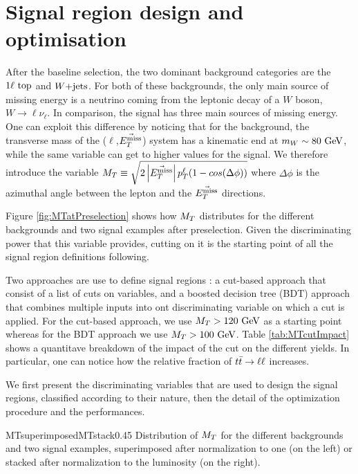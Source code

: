     \section{Signal region design and optimisation \label{sec:analysis_optimization}}

    After the baseline selection, the two dominant background categories are the $1\ell~\text{top}$
    and $\text{$W$+jets}$. For both of these backgrounds, the only main source of missing energy is a neutrino
    coming from the leptonic decay of a $W$ boson, $W \rightarrow \ell \nu_{\ell}$. In comparison,
    the signal has three main sources of missing energy. One can exploit this difference by noticing
    that for the background, the transverse mass of the ($\ell$,$\vec{E_T^\text{miss}}$) system has a kinematic
    end at $m_{W} \sim 80 ~\text{GeV}$, while the same variable can get to higher values for the signal.
    We therefore introduce the variable $M_T \equiv \sqrt{2 \left|\vec{E_T^\text{miss}}\right| p_T^\ell ( 1 - cos( \Delta \phi  ) ) }$
    where $\Delta \phi$ is the azimuthal angle between the lepton and the $\vec{E_T^\text{miss}}$ directions.

    Figure \ref{fig:MTatPreselection} shows how $M_T$ distributes for the different backgrounds and
    two signal examples after preselection. Given the discriminating power that this variable provides,
    cutting on it is the starting point of all the signal region definitions following. 
    
    Two approaches are use to define signal regions : a cut-based approach that consist of a list
    of cuts on variables, and a boosted decision tree (BDT) approach that combines multiple inputs into
    ont discriminating variable on which a cut is applied. For the cut-based approach, we use $M_T > 120 ~\text{GeV}$
    as a starting point whereas for the BDT approach we use $M_T > 100 ~\text{GeV}$. Table \ref{tab:MTcutImpact}
    shows a quantitave breakdown of the impact of the cut on the different yields. In particular, 
    one can notice how the relative fraction of $t\bar{t} \rightarrow \ell \ell$ increases.

    We first present the discriminating variables that are used to design the signal regions, classified
    according to their nature, then the detail of the optimization procedure and the performances.

                     {MTsuperimposed}{MTstack}{0.45}
                     {Distribution of $M_T$ for the different backgrounds and two signal examples,
                     superimposed after normalization to one (on the left) or stacked after normalization to the luminosity (on the right).}

